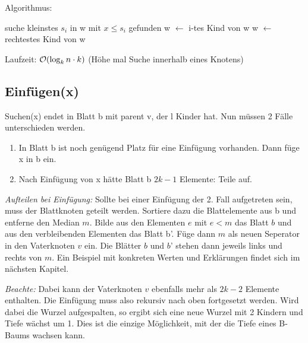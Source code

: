             Algorithmus: \\
            \begin{algorithm}
				\begin{algorithmic}
				 
	                \State suche kleinstes \( s_i \) in w mit \( x \leq s_i \) 
							\State gefunden
		                \Else
							\State w \( \leftarrow \) i-tes Kind von w
							\State {}
						\EndIf
	                \Else
		                \State w \( \leftarrow \) rechtestes Kind von w
						\State {}
					\EndIf
				\EndFunction
				\end{algorithmic}
            \end{algorithm}
            Laufzeit: $\mathcal{O}(\log_k n \cdot k)$ (Höhe mal Suche innerhalb eines Knotens)\\

        \subsection{Einfügen(x)}
            Suchen(x) endet in Blatt b mit parent v, der l Kinder hat. Nun müssen 2 Fälle unterschieden werden.
            \begin{enumerate}
                \item In Blatt b ist noch genügend Platz für eine Einfügung vorhanden. Dann füge x in b ein.
                \item Nach Einfügung von x hätte Blatt b $2k-1$ Elemente: Teile auf.
            \end{enumerate}
            
            \emph{Aufteilen bei Einfügung:} Sollte bei einer Einfügung der 2. Fall aufgetreten sein, muss der Blattknoten geteilt werden. Sortiere dazu die Blattelemente aus b und entferne den Median $m$. Bilde aus den Elementen $e$ mit $e < m$ das Blatt $b$ und aus den verbleibenden Elementen das Blatt b'. Füge dann $m$ als neuen Seperator in den Vaterknoten $v$ ein. Die Blätter $b$ und $b$' stehen dann jeweils links und rechts von $m$. Ein Beispiel mit konkreten Werten und Erklärungen findet sich im nächsten Kapitel.
            
            \emph{Beachte:} Dabei kann der Vaterknoten $v$ ebenfalls mehr als $2k-2$ Elemente enthalten. Die Einfügung muss also rekursiv nach oben fortgesetzt werden. Wird dabei die Wurzel aufgespalten, so ergibt sich eine neue Wurzel mit 2 Kindern und Tiefe wächst um 1. Dies ist die einzige Möglichkeit, mit der die Tiefe eines B-Baums wachsen kann.
            
